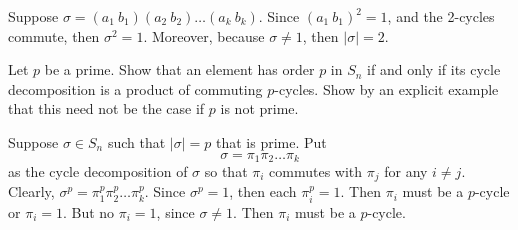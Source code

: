 \begin{problems}
\begin{sol}
        Suppose $\sigma = (a_1\ b_1)(a_2\ b_2) \ldots (a_k\ b_k)$. Since $(a_1\ b_1)^2 = 1$, and the 2-cycles commute, then $\sigma^2 = 1$. Moreover, because $\sigma \neq 1$, then $|\sigma| = 2$. 
    \end{sol}
    \item Let $p$ be a prime. Show that an element has order $p$ in $S_n$ if and only if its cycle decomposition is a product of commuting $p$-cycles. Show by an explicit example that this need not be the case if $p$ is not prime.
    \begin{sol}
        Suppose $\sigma \in S_n$ such that $|\sigma| = p$ that is prime. Put
        $$\sigma = \pi_1\pi_2\ldots\pi_k$$
        as the cycle decomposition of $\sigma$ so that $\pi_i$ commutes with $\pi_j$ for any $i \neq j$. Clearly, $\sigma^p = \pi_1^p\pi_2^p\ldots\pi_k^p$. Since $\sigma^p = 1$, then each $\pi_i^p = 1$. Then $\pi_i$ must be a $p$-cycle or $\pi_i = 1$. But no $\pi_i = 1$, since $\sigma \neq 1$. Then $\pi_i$ must be a $p$-cycle.
        

\end{sol}
\end{problems}
